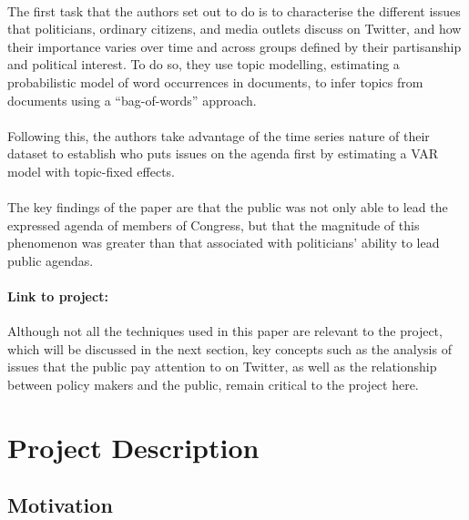 \documentclass[10pt,twocolumn,letterpaper]{article}
\begin{document}
\paragraph{} The first task that the authors set out to do is to characterise the different issues that politicians, ordinary citizens, and media outlets discuss on Twitter, and how their importance varies over time and across groups defined by their partisanship and political interest. To do so, they use topic modelling, estimating a probabilistic model of word occurrences in documents, to infer topics from documents using a “bag-of-words” approach.

\paragraph{} Following this, the authors take advantage of the time series nature of their dataset to establish who puts issues on the agenda first by estimating a VAR model with topic-fixed effects. 

\paragraph{} The key findings of the paper are that the public was not only able to lead the expressed agenda of members of Congress, but that the magnitude of this phenomenon was greater than that associated with politicians’ ability to lead public agendas. 

\paragraph{Link to project:} Although not all the techniques used in this paper are relevant to the project, which will be discussed in the next section, key concepts such as the analysis of issues that the public pay attention to on Twitter, as well as the relationship between policy makers and the public, remain critical to the project here.

\section{Project Description}

\subsection{Motivation}

\end{document}
